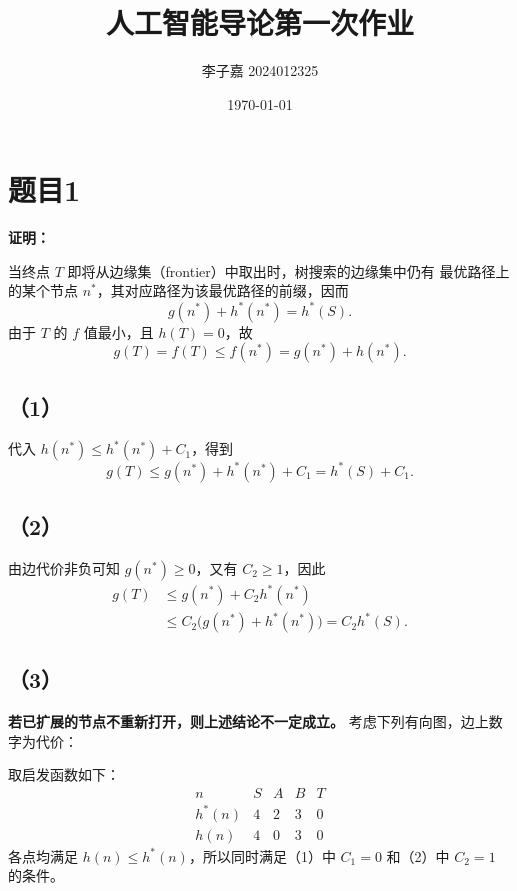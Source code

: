 \documentclass[utf8]{ctexart}
\title{\textbf{人工智能导论\quad 第一次作业}}
\date{\today}
\author{李子嘉 2024012325}
\theoremstyle{mystyle}
\begin{document}
\maketitle

\section*{题目1}
\textbf{证明：}

当终点 $T$ 即将从边缘集（frontier）中取出时，树搜索的边缘集中仍有
最优路径上的某个节点 $n^*$，其对应路径为该最优路径的前缀，因而
\[
  g(n^*)+h^*(n^*)=h^*(S).
\]
由于 $T$ 的 $f$ 值最小，且 $h(T)=0$，故
\[
  g(T)=f(T)\le f(n^*)=g(n^*)+h(n^*).
\]

\subsection*{（1）}
代入 $h(n^*)\le h^*(n^*)+C_1$，得到
\[
  g(T)\le g(n^*)+h^*(n^*)+C_1=h^*(S)+C_1.
\]

\subsection*{（2）}
由边代价非负可知 $g(n^*)\ge0$，又有 $C_2\ge1$，因此
\begin{align*}
  g(T)
  &\le g(n^*)+C_2h^*(n^*)\\
  &\le C_2\bigl(g(n^*)+h^*(n^*)\bigr)
   =C_2h^*(S).
\end{align*}

\subsection*{（3）}
\textbf{若已扩展的节点不重新打开，则上述结论不一定成立。}
考虑下列有向图，边上数字为代价：
\begin{center}
\end{center}
取启发函数如下：
\[
\begin{array}{c|cccc}
  n & S & A & B & T\\ \hline
  h^*(n) & 4 & 2 & 3 & 0\\
  h(n)   & 4 & 0 & 3 & 0
\end{array}
\]
各点均满足 $h(n)\le h^*(n)$，所以同时满足（1）中 $C_1=0$
和（2）中 $C_2=1$ 的条件。
\end{document}
